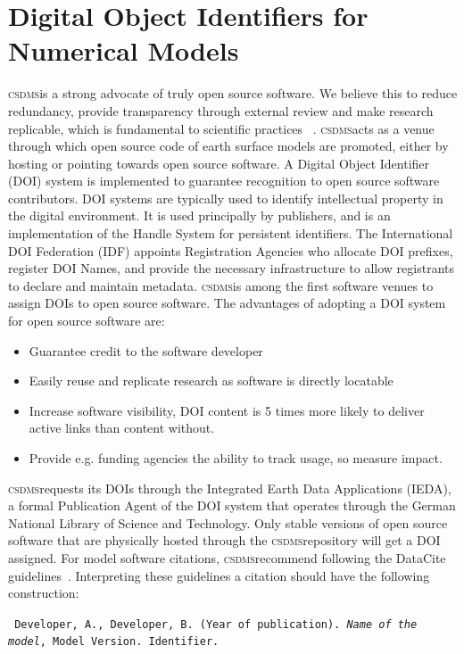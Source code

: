 \documentclass[11pt, oneside]{amsart}
\DeclareRobustCommand{\csdms}{\textsc{csdms}}
\begin{document}
\section{Digital Object Identifiers for Numerical Models}

\csdms is a strong advocate of truly open source software.  We believe this to
reduce redundancy, provide transparency through external review and make
research replicable, which is fundamental to scientific practices
~\cite{ince2012case}. \csdms acts as a venue through which open source code of
earth surface models are promoted, either by hosting or pointing towards open
source software. A Digital Object Identifier (DOI) system is implemented to
guarantee recognition to open source software contributors. DOI systems are
typically used to identify intellectual property in the digital environment.
It is used principally by publishers, and is an implementation of the Handle
System for persistent identifiers. The International DOI Federation (IDF)
appoints Registration Agencies who allocate DOI prefixes, register DOI Names,
and provide the necessary infrastructure to allow registrants to declare and
maintain metadata. \csdms is among the first software venues to assign DOIs to
open source software. The advantages of adopting a DOI system for open source
software are: 
\begin{itemize}
\item Guarantee credit to the software developer
\item Easily reuse and replicate research as software is directly locatable 
\item Increase software visibility, DOI content is 5 times more likely to
      deliver active links than content without.
\item Provide e.g. funding agencies the ability to track usage, so measure
      impact.
\end{itemize}

\csdms requests its DOIs through the Integrated Earth Data Applications (IEDA),
a formal Publication Agent of the DOI system that operates through the German
National Library of Science and Technology. Only stable versions of open source
software that are physically hosted through the \csdms repository will get a DOI
assigned. For model software citations, \csdms recommend following the DataCite
guidelines~\cite{brase2010datacite}. Interpreting these guidelines a citation
should have the following construction:

\begin{shaded}
\leftskip 0.25in
\parindent -0.25in
\tt{
Developer, A., Developer, B. (Year of publication). \emph{Name of the model},
Model Version. Identifier.
}
\end{shaded}
\end{document}
